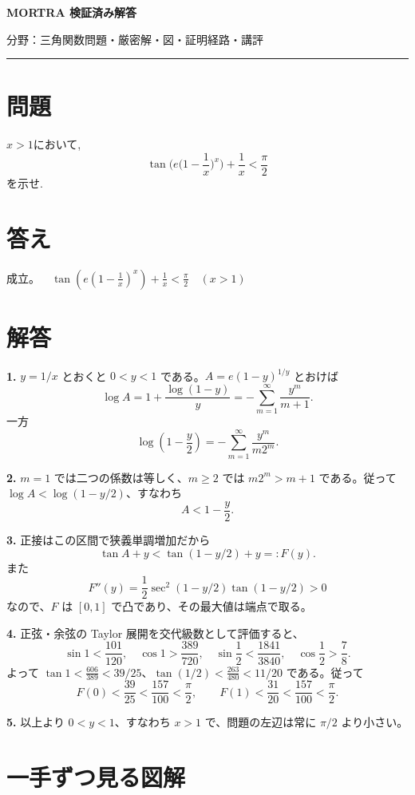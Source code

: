 \documentclass[uplatex,dvipdfmx,11pt]{jsarticle}
\begin{document}
\begin{center}
{\LARGE\bfseries MORTRA 検証済み解答\par}
\vspace{1mm}
{\small 分野：三角関数\qquad 問題・厳密解・図・証明経路・講評}
\end{center}
\vspace{1mm}
\hrule
\vspace{5mm}

\section*{問題}
$x>1$において,
\[
\tan \Big(e\Big(1-\dfrac1x \Big)^x \Big)+\dfrac{1}{x}<\dfrac{\pi}{2}
\]
を示せ.

\section*{答え}
\(\text{成立。}\quad\tan\!\left(e\left(1-\frac1{x}\right)^{x}\right)+\frac1{x}<\frac\pi2\quad(x>1)\)

\section*{解答}
\textbf{1.} \(y=1/x\) とおくと \(0<y<1\) である。\(A=e(1-y)^{1/y}\) とおけば \[\log A=1+\frac{\log(1-y)}y=-\sum_{m=1}^\infty\frac{y^m}{m+1}.\] 一方 \[\log\left(1-\frac y2\right)=-\sum_{m=1}^\infty\frac{y^m}{m2^m}.\]

\textbf{2.} \(m=1\) では二つの係数は等しく、\(m\ge2\) では \(m2^m>m+1\) である。従って \(\log A<\log(1-y/2)\)、すなわち \[A<1-\frac y2.\]

\textbf{3.} 正接はこの区間で狭義単調増加だから \[\tan A+y<\tan(1-y/2)+y=:F(y).\] また \[F''(y)=\frac12\sec^2(1-y/2)\tan(1-y/2)>0\] なので、\(F\) は \([0,1]\) で凸であり、その最大値は端点で取る。

\textbf{4.} 正弦・余弦の Taylor 展開を交代級数として評価すると、\[\sin1<\frac{101}{120},\quad\cos1>\frac{389}{720},\quad \sin\frac12<\frac{1841}{3840},\quad\cos\frac12>\frac78.\] よって \(\tan1<\frac{606}{389}<39/25\)、\(\tan(1/2)<\frac{263}{480}<11/20\) である。従って \[F(0)<\frac{39}{25}<\frac{157}{100}<\frac\pi2,\qquad F(1)<\frac{31}{20}<\frac{157}{100}<\frac\pi2.\]

\textbf{5.} 以上より \(0<y<1\)、すなわち \(x>1\) で、問題の左辺は常に \(\pi/2\) より小さい。

\clearpage

\section*{一手ずつ見る図解}
\end{document}
